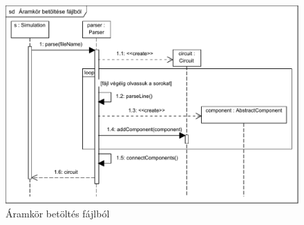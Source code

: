\begin{figure}[H]
\begin{center}
\includegraphics[width=17cm]{chapters/chapter03/seqdiagrams/aramkor_betoltes.pdf}
\caption{Áramkör betöltés fájlból}
\label{fig:aramkor_betoltes}
\end{center}
\end{figure}



